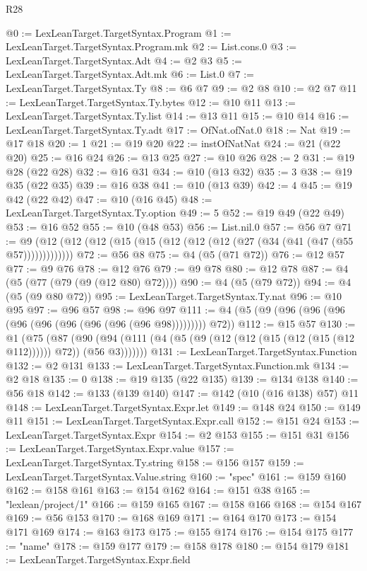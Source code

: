 \begin{lexlean}{R28}
\begin{coremodule}
@0 := LexLeanTarget.TargetSyntax.Program
@1 := LexLeanTarget.TargetSyntax.Program.mk
@2 := List.cons.{0}
@3 := LexLeanTarget.TargetSyntax.Adt
@4 := @2 @3
@5 := LexLeanTarget.TargetSyntax.Adt.mk
@6 := List.{0}
@7 := LexLeanTarget.TargetSyntax.Ty
@8 := @6 @7
@9 := @2 @8
@10 := @2 @7
@11 := LexLeanTarget.TargetSyntax.Ty.bytes
@12 := @10 @11
@13 := LexLeanTarget.TargetSyntax.Ty.list
@14 := @13 @11
@15 := @10 @14
@16 := LexLeanTarget.TargetSyntax.Ty.adt
@17 := OfNat.ofNat.{0}
@18 := Nat
@19 := @17 @18
@20 := 1
@21 := @19 @20
@22 := instOfNatNat
@24 := @21 (@22 @20)
@25 := @16 @24
@26 := @13 @25
@27 := @10 @26
@28 := 2
@31 := @19 @28 (@22 @28)
@32 := @16 @31
@34 := @10 (@13 @32)
@35 := 3
@38 := @19 @35 (@22 @35)
@39 := @16 @38
@41 := @10 (@13 @39)
@42 := 4
@45 := @19 @42 (@22 @42)
@47 := @10 (@16 @45)
@48 := LexLeanTarget.TargetSyntax.Ty.option
@49 := 5
@52 := @19 @49 (@22 @49)
@53 := @16 @52
@55 := @10 (@48 @53)
@56 := List.nil.{0}
@57 := @56 @7
@71 := @9 (@12 (@12 (@12 (@15 (@15 (@12 (@12 (@12 (@27 (@34 (@41 (@47 (@55 @57)))))))))))))
@72 := @56 @8
@75 := @4 (@5 (@71 @72))
@76 := @12 @57
@77 := @9 @76
@78 := @12 @76
@79 := @9 @78
@80 := @12 @78
@87 := @4 (@5 (@77 (@79 (@9 (@12 @80) @72))))
@90 := @4 (@5 (@79 @72))
@94 := @4 (@5 (@9 @80 @72))
@95 := LexLeanTarget.TargetSyntax.Ty.nat
@96 := @10 @95
@97 := @96 @57
@98 := @96 @97
@111 := @4 (@5 (@9 (@96 (@96 (@96 (@96 (@96 (@96 (@96 (@96 (@96 @98))))))))) @72))
@112 := @15 @57
@130 := @1
    (@75
      (@87 (@90 (@94 (@111 (@4 (@5 (@9 (@12 (@12 (@15 (@12 (@15 (@12 @112)))))) @72)) (@56 @3)))))))
@131 := LexLeanTarget.TargetSyntax.Function
@132 := @2 @131
@133 := LexLeanTarget.TargetSyntax.Function.mk
@134 := @2 @18
@135 := 0
@138 := @19 @135 (@22 @135)
@139 := @134 @138
@140 := @56 @18
@142 := @133 (@139 @140)
@147 := @142 (@10 (@16 @138) @57) @11
@148 := LexLeanTarget.TargetSyntax.Expr.let
@149 := @148 @24
@150 := @149 @11
@151 := LexLeanTarget.TargetSyntax.Expr.call
@152 := @151 @24
@153 := LexLeanTarget.TargetSyntax.Expr
@154 := @2 @153
@155 := @151 @31
@156 := LexLeanTarget.TargetSyntax.Expr.value
@157 := LexLeanTarget.TargetSyntax.Ty.string
@158 := @156 @157
@159 := LexLeanTarget.TargetSyntax.Value.string
@160 := "spec"
@161 := @159 @160
@162 := @158 @161
@163 := @154 @162
@164 := @151 @38
@165 := "lexlean/project/1"
@166 := @159 @165
@167 := @158 @166
@168 := @154 @167
@169 := @56 @153
@170 := @168 @169
@171 := @164 @170
@173 := @154 @171 @169
@174 := @163 @173
@175 := @155 @174
@176 := @154 @175
@177 := "name"
@178 := @159 @177
@179 := @158 @178
@180 := @154 @179
@181 := LexLeanTarget.TargetSyntax.Expr.field

\end{coremodule}
\end{lexlean}
